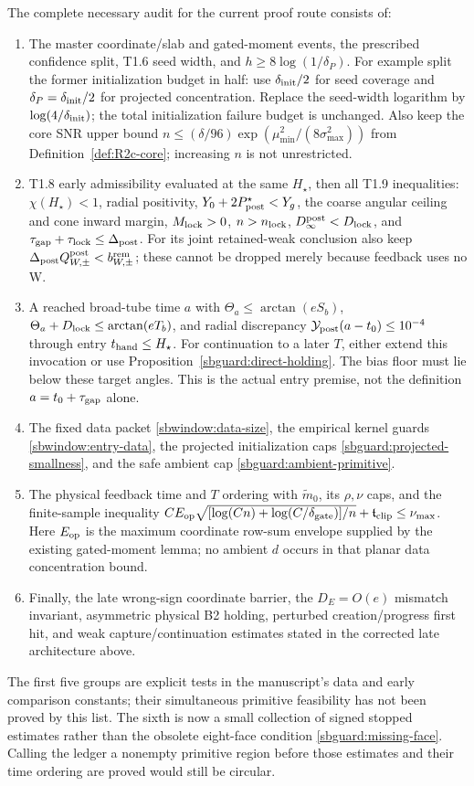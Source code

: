 \documentclass{article} %
\theoremstyle{plain}
\theoremstyle{definition}
\theoremstyle{remark}
\begin{document}
The complete necessary audit for the current proof route consists of:
\begin{enumerate}
\item The master coordinate/slab and gated-moment events, the prescribed
confidence split, T1.6 seed width, and $h\ge8\log(1/\delta_P)$.
For example split the former initialization budget in half: use
$\delta_{\rm init}/2$ for seed coverage and
$\delta_P=\delta_{\rm init}/2$ for projected concentration. Replace
the seed-width logarithm by $\log(4/\delta_{\rm init})$; the total
initialization failure budget is unchanged. Also keep the
core SNR upper bound $n\le(\delta/96)\exp(\mu_{\min}^2/(8\sigma_{\max}^2))$
from Definition~\ref{def:R2c-core}; increasing $n$ is not unrestricted.
\item T1.8 early admissibility evaluated at the same $H_\star$, then
all T1.9 inequalities: $\chi(H_\star)<1$, radial positivity,
$Y_0+2P_{\rm post}^\star<Y_g$, the coarse angular ceiling and cone
inward margin, $M_{\rm lock}>0$, $n>n_{\rm lock}$,
$D_\infty^{\rm post}<D_{\rm lock}$, and
$\tau_{\rm gap}+\tau_{\rm lock}\le\Delta_{\rm post}$.
For its joint retained-weak conclusion also keep
$\Delta_{\rm post}Q_{W,\pm}^{\rm post}<b_{W,\pm}^{\rm rem}$;
these cannot be dropped merely because feedback uses no W.
\item A reached broad-tube time $a$ with
$\Theta_a\le\arctan(eS_b)$,
$\Theta_a+D_{\rm lock}\le\arctan(eT_b)$, and radial discrepancy
$\mathcal Y_{\rm post}(a-t_0)\le10^{-4}$ through entry $t_{\rm hand}\le H_\star$. For continuation to a later $T$, either extend this invocation or use Proposition~\ref{sbguard:direct-holding}.
The bias floor must lie below these target angles. This is the actual
entry premise, not the definition $a=t_0+\tau_{\rm gap}$ alone.
\item The fixed data packet \eqref{sbwindow:data-size}, the empirical
kernel guards \eqref{sbwindow:entry-data}, the projected initialization
caps \eqref{sbguard:projected-smallness}, and the safe ambient cap
\eqref{sbguard:ambient-primitive}.
\item The physical feedback time and $T$ ordering with
$\widetilde m_0$, its $\rho,\nu$ caps, and the finite-sample inequality
$C E_{\rm op}\sqrt{[\log(Cn)+\log(C/\delta_{\rm gate})]/n}
+\mathfrak t_{\rm clip}\le\nu_{\max}$.
Here $E_{\rm op}$ is the maximum coordinate row-sum envelope supplied
by the existing gated-moment lemma; no ambient $d$ occurs in that
planar data concentration bound.
\item Finally, the late wrong-sign coordinate barrier, the $D_E=O(e)$
mismatch invariant, asymmetric physical B2 holding, perturbed
creation/progress first hit, and weak capture/continuation estimates stated in
the corrected late architecture above.
\end{enumerate}
The first five groups are explicit tests in the manuscript's data and early
comparison constants; their simultaneous primitive feasibility has not been
proved by this list.  The sixth is now a small collection of signed stopped
estimates rather than the obsolete eight-face condition
\eqref{sbguard:missing-face}.  Calling the ledger a nonempty primitive region
before those estimates and their time ordering are proved would still be
circular.
\end{document}
